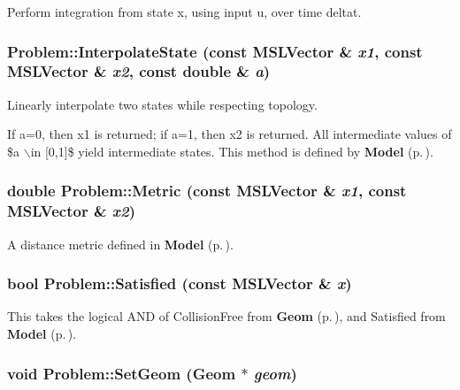 Perform integration from state x, using input u, over time deltat.

\subsubsection{ Problem::Interpolate\-State (const {\bf MSLVector} \& {\em x1}, const {\bf MSLVector} \& {\em x2}, const double \& {\em a})\hspace{0.3cm}{\tt  [virtual]}}\label{classProblem_a7}


Linearly interpolate two states while respecting topology.

If a=0, then x1 is returned; if a=1, then x2 is returned. All intermediate values of \$a $\backslash$in [0,1]\$ yield intermediate states. This method is defined by {\bf Model} {\rm (p.\,\pageref{classModel})}. 
\subsubsection{\setlength{\rightskip}{0pt plus 5cm}double Problem::Metric (const {\bf MSLVector} \& {\em x1}, const {\bf MSLVector} \& {\em x2})\hspace{0.3cm}{\tt  [virtual]}}\label{classProblem_a8}


A distance metric defined in {\bf Model} {\rm (p.\,\pageref{classModel})}.

\subsubsection{\setlength{\rightskip}{0pt plus 5cm}bool Problem::Satisfied (const {\bf MSLVector} \& {\em x})\hspace{0.3cm}{\tt  [virtual]}}\label{classProblem_a11}


This takes the logical AND of Collision\-Free from {\bf Geom} {\rm (p.\,\pageref{classGeom})}, and Satisfied from {\bf Model} {\rm (p.\,\pageref{classModel})}.

\subsubsection{\setlength{\rightskip}{0pt plus 5cm}void Problem::Set\-Geom ({\bf Geom} $\ast$ {\em geom})}\label{classProblem_a2}



